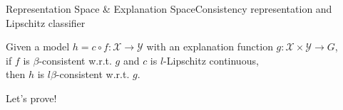\documentclass[10pt, aspectratio=169]{beamer}
\begin{document}
	\begin{frame}[t]{Representation Space \& Explanation Space}{Consistency representation and Lipschitz classifier}
		\begin{theorem}
			Given a model $h=c\circ f : \mathcal{X}\to\mathcal{Y}$ with an explanation function $g:\mathcal{X}\times\mathcal{Y}\to G$,\\
			if $f$ is $\beta$-consistent w.r.t. $g$ and $c$ is $l$-Lipschitz continuous,\\
			then $h$ is $l\beta$-consistent w.r.t. $g$.
		\end{theorem}
		Let's prove!
	\end{frame}
	
	
\end{document}
